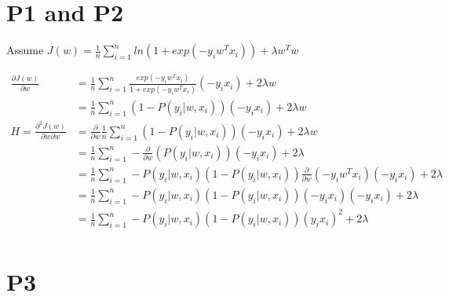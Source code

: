 \documentclass{article}
\newcommand{\s}{\sum\limits_{i=1}^{n}}
\newcommand{\p}[2]{\frac{\partial #1}{\partial #2}}
\newcommand{\pp}[3]{\frac{{\partial}^2 #1}{\partial #2 \partial #3}}
\begin{document}
\section{P1 and P2}

Assume $J(w) = \frac{1}{n} \s ln(1+exp(-y_i w^T x_i)) + \lambda w^Tw$

\newcommand{\e}{exp(-y_i w^T x_i)}
\newcommand{\ee}{exp(-2y_i w^T x_i)}

$
\begin{aligned}
  \p{J(w)}{w}         &= \frac{1}{n} \s \frac{\e}{1+\e} (-y_ix_i) + 2\lambda w \\
                      &= \frac{1}{n} \s (1-P(y_i|w,x_i))(-y_ix_i) + 2\lambda w \\
  H = \pp{J(w)}{w}{w} &= \p{}{w} \frac{1}{n} \s (1-P(y_i|w,x_i))(-y_ix_i) + 2\lambda w \\
                      &= \frac{1}{n} \s -\p{}{w}(P(y_i|w,x_i))(-y_ix_i) + 2\lambda \\
                      &= \frac{1}{n} \s -P(y_i|w,x_i)(1-P(y_i|w,x_i)) \p{}{w}(-y_iw^Tx_i)(-y_ix_i) + 2\lambda \\
                      &= \frac{1}{n} \s -P(y_i|w,x_i)(1-P(y_i|w,x_i)) (-y_ix_i)(-y_ix_i) + 2\lambda \\
                      &= \frac{1}{n} \s -P(y_i|w,x_i)(1-P(y_i|w,x_i)) (y_ix_i)^2 + 2\lambda \\
\end{aligned}
$

\section{P3}



\end{document}
